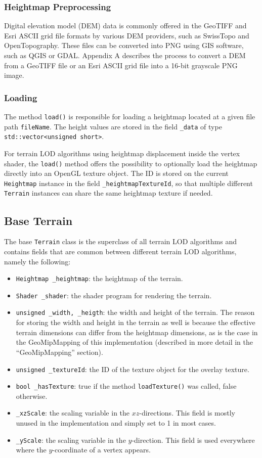 \subsubsection{Heightmap Preprocessing}
Digital elevation model (DEM) data is commonly offered in the GeoTIFF and Esri ASCII grid file formats by various DEM providers,
such as SwissTopo and OpenTopography.
These files can be converted into PNG using GIS software, such as 
QGIS or GDAL. Appendix A describes the process to convert 
a DEM from a GeoTIFF file or an Esri ASCII grid file into 
a 16-bit grayscale PNG image.

\subsubsection{Loading}
The method \texttt{load()} is responsible for loading a heightmap
located at a given file path \texttt{fileName}.
The height values are stored in the field \texttt{\_data} of type \texttt{std::vector<unsigned short>}.

For terrain LOD algorithms using heightmap displacement inside the vertex shader, 
the \texttt{load()} method offers the possibility to optionally load the heightmap 
directly into an OpenGL texture object. The ID is stored on the current \texttt{Heightmap}
instance in the field \texttt{\_heightmapTextureId}, so that multiple different 
\texttt{Terrain} instances can share the same heightmap texture if needed.

\subsection{Base Terrain}
The base \texttt{Terrain} class is the superclass of all terrain LOD algorithms and 
contains fields that are common between different terrain LOD algorithms,
namely the following:
\begin{itemize}
  \item \texttt{Heightmap \_heightmap}: the heightmap of the terrain.
  \item \texttt{Shader \_shader}: the shader program for rendering the terrain.
  \item \texttt{unsigned \_width, \_heigth}: the width and height of the terrain. 
    The reason for storing the width and height in the terrain as well is 
    because the effective terrain dimensions can differ from the heightmap dimensions,
    as is the case in the GeoMipMapping of this implementation (described in more detail in the ``GeoMipMapping'' section).
  \item \texttt{unsigned \_textureId}: the ID of the texture object for the overlay texture.
  \item \texttt{bool \_hasTexture}: true if the method \texttt{loadTexture()} was called, false otherwise.
  \item \texttt{\_xzScale}: the scaling variable in the $xz$-directions. 
  This field is mostly unused in the implementation and simply set to 1 in most cases.
  \item \texttt{\_yScale}: the scaling variable in the $y$-direction. 
  This field is used everywhere where the $y$-coordinate of a vertex appears.
\end{itemize}

